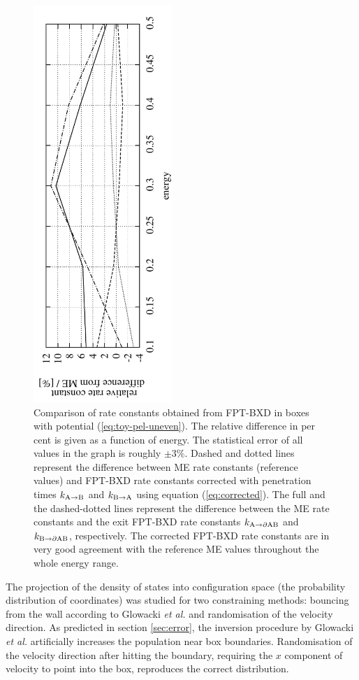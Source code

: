 \begin{figure}[h!]
\centering
\includegraphics[height=15cm, angle=270]{Images/inequal.pdf}
\caption[FPT-BXD performance for uneven boxes.]{Comparison of rate constants obtained from FPT-BXD in boxes with potential (\ref{eq:toy-pel-uneven}). The relative difference in per cent is given as a function of energy. The statistical error of all values in the graph is roughly $\pm 3 \%$. Dashed and dotted lines represent the difference between ME rate constants (reference values) and FPT-BXD rate constants corrected with penetration times $k_{\rm A \rightarrow B}$ and $k_{\rm B \rightarrow A}$ using equation (\ref{eq:corrected}). The full and the dashed-dotted lines represent the difference between the ME rate constants and the exit FPT-BXD rate constants $k_{\rm A \rightarrow \partial AB}$ and $k_{\rm B \rightarrow \partial AB}$, respectively. The corrected FPT-BXD rate constants are in very good agreement with the reference ME values throughout the whole energy range.}
\label{fig:uneven}
\end{figure}

The projection of the density of states into configuration space (the probability distribution of coordinates) was studied for two constraining methods: bouncing from the wall according to Glowacki {\it et al.}\cite{Glowacki2009} and randomisation of the velocity direction.
As predicted in section \ref{sec:error}, the inversion procedure by Glowacki {\it et al.}\cite{Glowacki2009} artificially increases the population near box boundaries.
Randomisation of the velocity direction after hitting the boundary, requiring the $x$ component of velocity to point into the box, reproduces the correct distribution.

